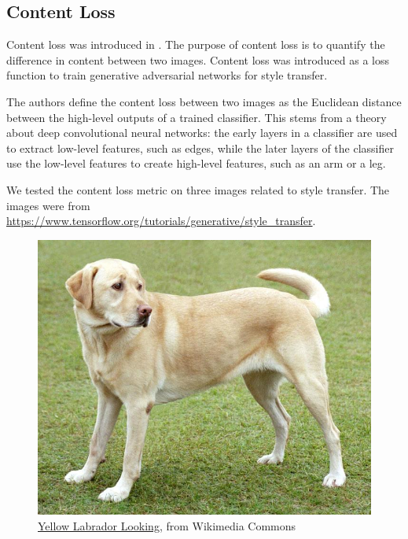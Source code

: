 \subsection{Content Loss}

Content loss was introduced in . The purpose of content loss is to quantify the difference in content between two images. Content loss was introduced as a loss function to train generative adversarial networks for style transfer.

The authors define the content loss between two images as the Euclidean distance between the high-level outputs of a trained classifier. This stems from a theory about deep convolutional neural networks: the early layers in a classifier are used to extract low-level features, such as edges, while the later layers of the classifier use the low-level features to create high-level features, such as an arm or a leg.

We tested the content loss metric on three images related to style transfer. The images were from \url{https://www.tensorflow.org/tutorials/generative/style_transfer}. 

\begin{figure}[H]
    \centering
    \includegraphics[width=\linewidth]{Figures/content_loss_images/lab1.jpg}
    \caption{\href{https://commons.wikimedia.org/wiki/File:YellowLabradorLooking_new.jpg}{Yellow Labrador Looking}, from Wikimedia Commons}
    \label{fig:lab_original}
\end{figure}

